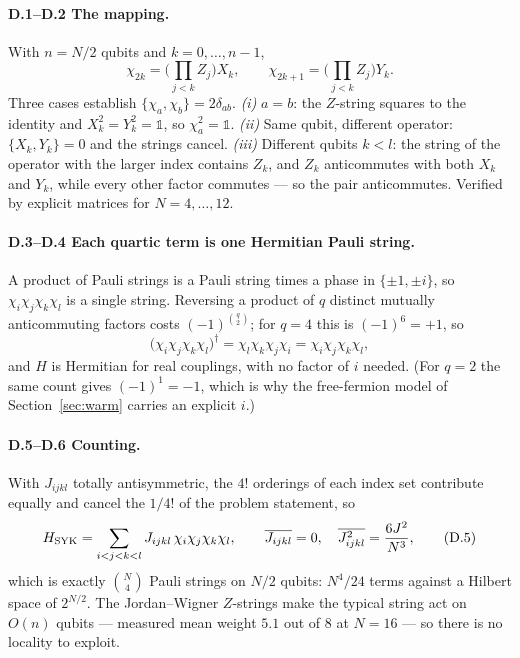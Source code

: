 \paragraph{\textsf{D.1}--\textsf{D.2} The mapping.}
With $n=N/2$ qubits and $k=0,\dots,n-1$,
\begin{equation}
  \chi_{2k} = \Big(\prod_{j<k}Z_j\Big)X_k,
  \qquad
  \chi_{2k+1} = \Big(\prod_{j<k}Z_j\Big)Y_k .
  \tag{D.0}
\end{equation}
Three cases establish $\{\chi_a,\chi_b\}=2\delta_{ab}$. \emph{(i)} $a=b$: the
$Z$-string squares to the identity and $X_k^2=Y_k^2=\mathbb{1}$, so
$\chi_a^2=\mathbb{1}$. \emph{(ii)} Same qubit, different operator:
$\{X_k,Y_k\}=0$ and the strings cancel. \emph{(iii)} Different qubits $k<l$:
the string of the operator with the larger index contains $Z_k$, and $Z_k$
anticommutes with both $X_k$ and $Y_k$, while every other factor commutes ---
so the pair anticommutes. Verified by explicit matrices for $N=4,\dots,12$.

\paragraph{\textsf{D.3}--\textsf{D.4} Each quartic term is one Hermitian Pauli
string.}
A product of Pauli strings is a Pauli string times a phase in
$\{\pm1,\pm i\}$, so $\chi_i\chi_j\chi_k\chi_l$ is a single string. Reversing a
product of $q$ distinct mutually anticommuting factors costs
$(-1)^{\binom{q}{2}}$; for $q=4$ this is $(-1)^6=+1$, so
\begin{equation}
  \big(\chi_i\chi_j\chi_k\chi_l\big)^\dagger
  = \chi_l\chi_k\chi_j\chi_i
  = \chi_i\chi_j\chi_k\chi_l ,
  \tag{D.4}
\end{equation}
and $H$ is Hermitian for real couplings, with no factor of $i$ needed. (For
$q=2$ the same count gives $(-1)^1=-1$, which is why the free-fermion model of
Section~\ref{sec:warm} carries an explicit $i$.)

\paragraph{\textsf{D.5}--\textsf{D.6} Counting.}
With $J_{ijkl}$ totally antisymmetric, the $4!$ orderings of each index set
contribute equally and cancel the $1/4!$ of the problem statement, so
\begin{equation}
  H_{\rm SYK} = \sum_{i<j<k<l} J_{ijkl}\,\chi_i\chi_j\chi_k\chi_l ,
  \qquad
  \overline{J_{ijkl}}=0,\quad \overline{J^2_{ijkl}}=\frac{6J^2}{N^3},
  \tag{D.5}
\end{equation}
which is exactly $\binom{N}{4}$ Pauli strings on $N/2$ qubits: $N^4/24$ terms
against a Hilbert space of $2^{N/2}$. The Jordan--Wigner $Z$-strings make the
typical string act on $O(n)$ qubits --- measured mean weight $5.1$ out of $8$
at $N=16$ --- so there is no locality to exploit.

